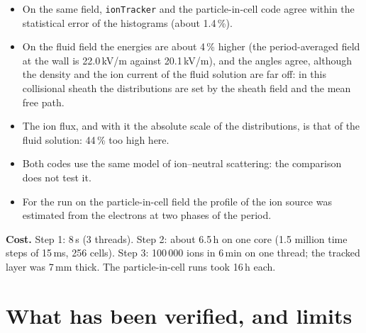 \documentclass[10pt,a4paper]{article}
\newcommand{\kw}[1]{\texttt{#1}}
\begin{document}
\begin{itemize}[leftmargin=1.4em,itemsep=1pt]
\item On the same field, \kw{ionTracker} and the particle-in-cell code agree
  within the statistical error of the histograms (about 1.4\,\%).
\item On the fluid field the energies are about 4\,\% higher (the
  period-averaged field at the wall is 22.0\,kV/m against 20.1\,kV/m), and
  the angles agree, although the density and the ion current of the fluid
  solution are far off: in this collisional sheath the distributions are set
  by the sheath field and the mean free path.
\item The ion flux, and with it the absolute scale of the distributions, is
  that of the fluid solution: 44\,\% too high here.
\item Both codes use the same model of ion--neutral scattering: the
  comparison does not test it.
\item For the run on the particle-in-cell field the profile of the ion source
  was estimated from the electrons at two phases of the period.
\end{itemize}

\textbf{Cost.} Step 1: 8\,s (3 threads). Step 2: about 6.5\,h on one core
(1.5 million time steps of 15\,ms, 256 cells). Step 3: 100\,000 ions in
6\,min on one thread; the tracked layer was 7\,mm thick. The
particle-in-cell runs took 16\,h each.

\section{What has been verified, and limits}
\end{document}
